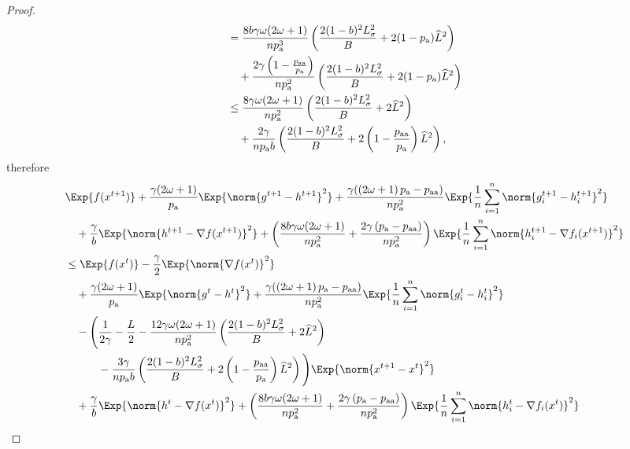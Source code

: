 \documentclass{article}
\newcommand*{\probavailable}{\ensuremath{p_{\textnormal{a}}}}
\newcommand*{\probpairaa}{\ensuremath{p_{\textnormal{aa}}}}
\begin{document}
\begin{proof}
\begin{align*}
      &=\frac{8 b \gamma \omega (2 \omega + 1)}{n \probavailable^3} \left(\frac{2 (1 - b)^2 L_{\sigma}^2}{B} + 2(1 - \probavailable) \widehat{L}^2\right) \\
      &\quad + \frac{2 \gamma \left(1 - \frac{\probpairaa}{\probavailable}\right)}{n \probavailable^2} \left(\frac{2 (1 - b)^2 L_{\sigma}^2}{B} + 2(1 - \probavailable) \widehat{L}^2\right) \\
      &\leq \frac{8 \gamma \omega (2 \omega + 1)}{n \probavailable^2} \left(\frac{2 (1 - b)^2 L_{\sigma}^2}{B} + 2 \widehat{L}^2\right) \\
      &\quad + \frac{2 \gamma}{n \probavailable b} \left(\frac{2 (1 - b)^2 L_{\sigma}^2}{B} + 2\left(1 - \frac{\probpairaa}{\probavailable}\right) \widehat{L}^2\right),
    \end{align*}
    therefore
    \begin{align*}
      &\Exp{f(x^{t + 1})} + \frac{\gamma (2 \omega + 1)}{\probavailable} \Exp{\norm{g^{t+1} - h^{t+1}}^2} + \frac{\gamma (\left(2 \omega + 1\right)\probavailable - \probpairaa)}{n \probavailable^2} \Exp{\frac{1}{n}\sum_{i=1}^n\norm{g^{t+1}_i - h^{t+1}_i}^2}\\
      &\quad  + \frac{\gamma}{b} \Exp{\norm{h^{t+1} - \nabla f(x^{t+1})}^2} + \left(\frac{8 b \gamma \omega (2 \omega + 1)}{n \probavailable^2} + \frac{2 \gamma \left(\probavailable - \probpairaa\right)}{n \probavailable^2}\right) \Exp{\frac{1}{n}\sum_{i=1}^n\norm{h^{t+1}_i - \nabla f_i(x^{t+1})}^2}\\
      &\leq \Exp{f(x^t)} - \frac{\gamma}{2}\Exp{\norm{\nabla f(x^t)}^2} \\
      &\quad + \frac{\gamma (2 \omega + 1)}{\probavailable} \Exp{\norm{g^{t} - h^{t}}^2} + \frac{\gamma (\left(2 \omega + 1\right)\probavailable - \probpairaa)}{n \probavailable^2} \Exp{\frac{1}{n}\sum_{i=1}^n\norm{g^{t}_i - h^{t}_i}^2} \\
      &\quad - \Bigg(\frac{1}{2\gamma} - \frac{L}{2} - \frac{12 \gamma \omega (2 \omega + 1)}{n \probavailable^2} \left(\frac{2 (1 - b)^2 L_{\sigma}^2}{B} + 2 \widehat{L}^2\right) \\
      &\qquad\quad - \frac{3 \gamma}{n \probavailable b}\left(\frac{2 (1 - b)^2 L_{\sigma}^2}{B} + 2\left(1 - \frac{\probpairaa}{\probavailable}\right) \widehat{L}^2 \right)\Bigg) \Exp{\norm{x^{t+1} - x^t}^2} \\
      &\quad + \frac{\gamma}{b} \Exp{\norm{h^{t} - \nabla f(x^{t})}^2} + \left(\frac{8 b \gamma \omega (2 \omega + 1)}{n \probavailable^2} + \frac{2 \gamma \left(\probavailable - \probpairaa\right)}{n \probavailable^2}\right)\Exp{\frac{1}{n}\sum_{i=1}^n\norm{h^{t}_i - \nabla f_i(x^{t})}^2} \\

\end{align*}
\end{proof}
\end{document}
